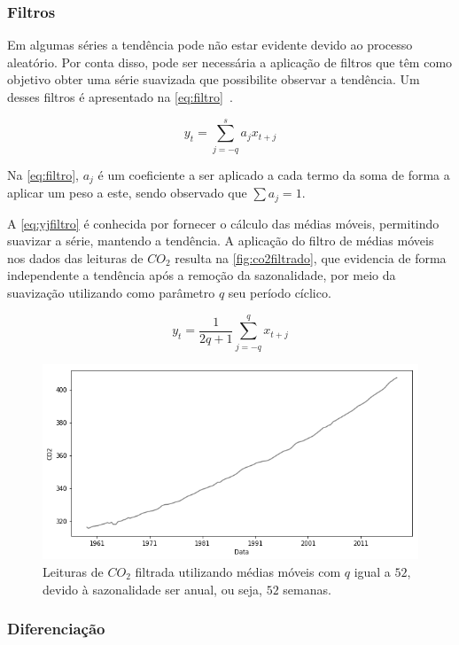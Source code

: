 \documentclass[
    12pt,
    oneside,
    a4paper,
    english,
    brazil
]{abntex2}
\begin{document}
\subsubsection{Filtros}

Em  algumas séries  a  tendência pode  não estar  evidente  devido ao  processo
aleatório. Por conta disso, pode ser  necessária a aplicação de filtros que têm
como objetivo obter  uma série suavizada que possibilite  observar a tendência.
Um desses filtros é apresentado na \autoref{eq:filtro}~\cite{ehlers}.

\begin{equation}
    \label{eq:filtro}
    y_t = \sum_{j = -q}^{s}{a_{j}x_{t+j}}
\end{equation}

Na \autoref{eq:filtro}, $a_j$  é um coeficiente a ser aplicado  a cada termo da
soma de forma a aplicar um peso a este, sendo observado que $\sum{a_j} = 1$.

A  \autoref{eq:yjfiltro}  é  conhecida  por   fornecer  o  cálculo  das  médias
móveis,  permitindo  suavizar  a  série,  mantendo  a  tendência.  A  aplicação
do  filtro  de médias  móveis  nos  dados das  leituras  de  $CO_2$ resulta  na
\autoref{fig:co2filtrado}, que evidencia de forma independente a tendência após
a remoção da sazonalidade, por meio da suavização utilizando como parâmetro $q$
seu período cíclico.

\begin{equation}
    \label{eq:yjfiltro}
    y_t = \frac{1}{2q + 1}\sum_{j=-q}^{q}{x_{t+j}}
\end{equation}

\begin{figure}[ht]
    \centering
    \caption{Leituras de $CO_2$ filtrada utilizando médias móveis com $q$ igual
        a $52$, devido à sazonalidade ser anual, ou seja, $52$
        semanas.}\label{fig:co2filtrado}
    \includegraphics[width=.5\linewidth]{images/co2_filtered.png}
\end{figure}

\subsubsection{Diferenciação}\label{sec:diff}
\end{document}

